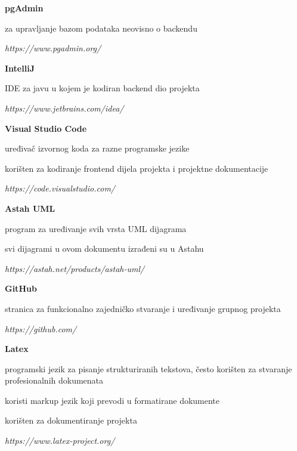 \begin{packed_item}
				\item \textbf{pgAdmin}
				\begin{packed_item}
					\item za upravljanje bazom podataka neovisno o backendu 
					\item \textit{ https://www.pgadmin.org/}
				\end{packed_item}

				\item \textbf{IntelliJ }
				\begin{packed_item}
					\item  IDE za javu u kojem je kodiran backend dio projekta 
					\item \textit{ https://www.jetbrains.com/idea/}
				\end{packed_item}

				\item \textbf{Visual Studio Code}
				\begin{packed_item}
					\item  uređivač izvornog koda za razne programske jezike
					\item  korišten za kodiranje frontend dijela projekta i projektne dokumentacije
					\item \textit{ https://code.visualstudio.com/}
				\end{packed_item}

				\item \textbf{Astah UML }
				\begin{packed_item}
					\item program za uređivanje svih vrsta UML dijagrama
					\item svi dijagrami u ovom dokumentu izrađeni su u Astahu 
					\item \textit{https://astah.net/products/astah-uml/}
				\end{packed_item}

				\item \textbf{GitHub }
				\begin{packed_item}
					\item  stranica za funkcionalno zajedničko stvaranje i uređivanje grupnog projekta 
					\item \textit{https://github.com/}
				\end{packed_item}

				\item \textbf{Latex}
				\begin{packed_item}
					\item programski jezik za pisanje strukturiranih tekstova, često korišten za stvaranje profesionalnih dokumenata
					\item koristi markup jezik koji prevodi u formatirane dokumente
					\item korišten za dokumentiranje projekta
					\item \textit{https://www.latex-project.org/}
				\end{packed_item}
			\end{packed_item}
			
